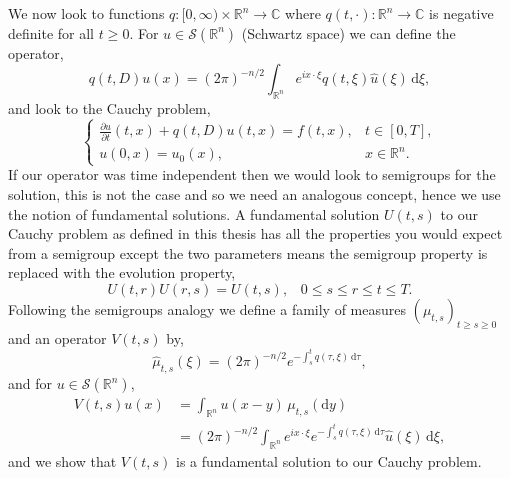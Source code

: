 \documentclass[a4paper, 12pt]{report}
\theoremstyle{remark}
\theoremstyle{definition}
\begin{document}
We now look to functions $q : [0, \infty) \times \mathbb{R}^n \to \mathbb{C}$ where $q(t, \cdot) : \mathbb{R}^n \to \mathbb{C}$ is negative definite for all $t \ge 0$.  For $u \in \mathcal{S}(\mathbb{R}^n)$ (Schwartz space) we can define the operator,
$$
q(t, D)u(x) = (2\pi)^{-n/2}\int_{\mathbb{R}^n}e^{ix\cdot\xi}q(t, \xi)\hat{u}(\xi)\,\mathrm{d}\xi,
$$
and look to the Cauchy problem,
$$
\begin{cases}
\frac{\partial u}{\partial t}(t, x) + q(t, D)u(t, x) = f(t, x), & t \in [0, T],\\
u(0, x) = u_0(x), & x \in \mathbb{R}^n.
\end{cases}
$$
If our operator was time independent then we would look to semigroups for the solution, this is not the case and so we need an analogous concept, hence we use the notion of fundamental solutions.  A fundamental solution $U(t, s)$ to our Cauchy problem as defined in this thesis has all the properties you would expect from a semigroup except the two parameters means the semigroup property is replaced with the evolution property,
$$
U(t, r)U(r, s) = U(t, s), \,\,\,\,\, 0 \le s \le r \le t \le T.
$$
Following the semigroups analogy we define a family of measures $(\mu_{t, s})_{t \ge s \ge 0}$ and an operator $V(t, s)$ by,
$$
\hat{\mu}_{t, s}(\xi) = (2\pi)^{-n/2}e^{-\int_s^tq(\tau, \xi)\,\mathrm{d}\tau},
$$
and for $u \in \mathcal{S}(\mathbb{R}^n)$,
$$
\begin{aligned}
V(t, s)u(x) & = \int_{\mathbb{R}^n}u(x - y)\,\mu_{t, s}(\mathrm{d}y)\\
& = (2\pi)^{-n/2}\int_{\mathbb{R}^n}e^{ix\cdot\xi}e^{-\int_s^tq(\tau, \xi)\,\mathrm{d}\tau}\hat{u}(\xi)\,\mathrm{d}\xi,
\end{aligned}
$$
and we show that $V(t, s)$ is a fundamental solution to our Cauchy problem.
\end{document}
